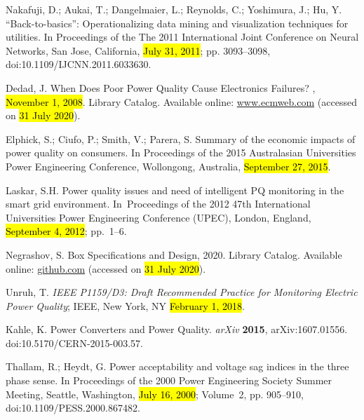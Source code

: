 \documentclass[energies,article,accept,moreauthors,pdftex]{Definitions/mdpi}
\begin{document}
\begin{thebibliography}{999}
Nakafuji, D.; Aukai, T.; Dangelmaier, L.; Reynolds, C.; Yoshimura, J.; {
Hu, Y}.
\newblock “{Back}-to-basics”: {Operationalizing} data mining and visualization
techniques for utilities.
\newblock In {Proceedings of the }The 2011 International Joint Conference on Neural Networks, San Jose, California, \hl{July 31, 2011}; pp. 3093--3098, doi:10.1109/IJCNN.2011.6033630.

Dedad, J.
\newblock When {Does} {Poor} {Power} {Quality} {Cause} {Electronics}
{Failures}?
, {\hl{November 1, 2008}}.
\newblock Library Catalog.  Available online:  \url{www.ecmweb.com} (accessed on \hl{31 July 2020}).

Elphick, S.; Ciufo, P.; Smith, V.; Parera, S.
\newblock Summary of the economic impacts of power quality on consumers.
\newblock  In {Proceedings of the }2015 {Australasian} {Universities} {Power} {Engineering}
{Conference}, Wollongong, Australia, \hl{September 27, 2015}.

Laskar, S.H.
\newblock Power quality issues and need of intelligent {PQ} monitoring in the
smart grid environment.
\newblock In~{Proceedings of the }2012 47th
{International} Universities {Power} {Engineering} {Conference} ({UPEC}), London, England, \hl{September 4, 2012}; pp.~1--6.

Negrashov, S.
 {Box} {Specifications} and {Design}, 2020.
\newblock Library Catalog.  Available online:  \url{github.com} (accessed on \hl{31 July 2020}).

Unruh, T.
\newblock \emph{IEEE P1159/D3: {Draft} {Recommended} {Practice} for
{Monitoring} {Electric} {Power} {Quality}}; IEEE, New York, NY \hl{February 1, 2018}. %

Kahle, K.
\newblock Power {Converters} and {Power} {Quality}.
\newblock \emph{arXiv} \textbf{2015}, arXiv:1607.01556. doi:10.5170/CERN-2015-003.57.


Thallam, R.; Heydt, G.
\newblock Power acceptability and voltage sag indices in the three phase sense.
\newblock In {Proceedings of the } 2000 {Power} {Engineering} {Society} {Summer} {Meeting}, Seattle, Washington,
 \hl{July 16, 2000}; Volume~2, pp. 905--910, doi:10.1109/PESS.2000.867482.


\end{thebibliography}
\end{document}
